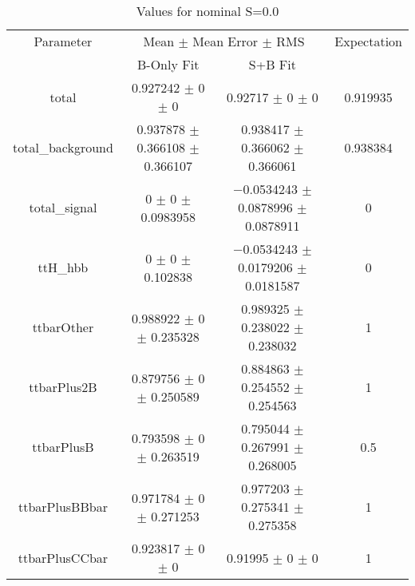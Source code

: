 \begin{table}
\centering
\caption{Values for nominal S=0.0}
\begin{tabular}{cccc}
\toprule
Parameter & \multicolumn{2}{c}{Mean $\pm$ Mean Error $\pm$ RMS} & Expectation\\
 & B-Only Fit & S+B Fit & \\
\midrule
total & \num{0.927242} $\pm$ \num{0} $\pm$ \num{0} & \num{0.92717} $\pm$ \num{0} $\pm$ \num{0} & \num{0.919935}\\
total\_background & \num{0.937878} $\pm$ \num{0.366108} $\pm$ \num{0.366107} & \num{0.938417} $\pm$ \num{0.366062} $\pm$ \num{0.366061} & \num{0.938384}\\
total\_signal & \num{0} $\pm$ \num{0} $\pm$ \num{0.0983958} & \num{-0.0534243} $\pm$ \num{0.0878996} $\pm$ \num{0.0878911} & \num{0}\\
ttH\_hbb & \num{0} $\pm$ \num{0} $\pm$ \num{0.102838} & \num{-0.0534243} $\pm$ \num{0.0179206} $\pm$ \num{0.0181587} & \num{0}\\
ttbarOther & \num{0.988922} $\pm$ \num{0} $\pm$ \num{0.235328} & \num{0.989325} $\pm$ \num{0.238022} $\pm$ \num{0.238032} & \num{1}\\
ttbarPlus2B & \num{0.879756} $\pm$ \num{0} $\pm$ \num{0.250589} & \num{0.884863} $\pm$ \num{0.254552} $\pm$ \num{0.254563} & \num{1}\\
ttbarPlusB & \num{0.793598} $\pm$ \num{0} $\pm$ \num{0.263519} & \num{0.795044} $\pm$ \num{0.267991} $\pm$ \num{0.268005} & \num{0.5}\\
ttbarPlusBBbar & \num{0.971784} $\pm$ \num{0} $\pm$ \num{0.271253} & \num{0.977203} $\pm$ \num{0.275341} $\pm$ \num{0.275358} & \num{1}\\
ttbarPlusCCbar & \num{0.923817} $\pm$ \num{0} $\pm$ \num{0} & \num{0.91995} $\pm$ \num{0} $\pm$ \num{0} & \num{1}\\
\bottomrule
\end{tabular}
\end{table}